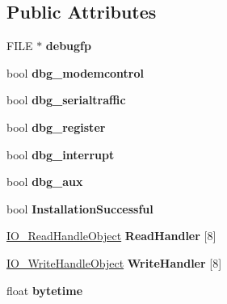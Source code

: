 \subsection*{Public Attributes}
\begin{DoxyCompactItemize}
\item 
\hypertarget{classCSerial_a67f37feb590d4f760e02194d97695ab1}{F\-I\-L\-E $\ast$ {\bfseries debugfp}}\label{classCSerial_a67f37feb590d4f760e02194d97695ab1}

\item 
\hypertarget{classCSerial_a3d950dbe5126390b733ce4a9480b2705}{bool {\bfseries dbg\-\_\-modemcontrol}}\label{classCSerial_a3d950dbe5126390b733ce4a9480b2705}

\item 
\hypertarget{classCSerial_af9e0c7fc953f326d6b9f03bb109fed68}{bool {\bfseries dbg\-\_\-serialtraffic}}\label{classCSerial_af9e0c7fc953f326d6b9f03bb109fed68}

\item 
\hypertarget{classCSerial_a84b4d02b7b4c5a55a7437fe23e5f5ca0}{bool {\bfseries dbg\-\_\-register}}\label{classCSerial_a84b4d02b7b4c5a55a7437fe23e5f5ca0}

\item 
\hypertarget{classCSerial_a81a9f2fd1073b8d3707d9eec242d7049}{bool {\bfseries dbg\-\_\-interrupt}}\label{classCSerial_a81a9f2fd1073b8d3707d9eec242d7049}

\item 
\hypertarget{classCSerial_a9e26d371839dcbcc62df76c4d0940327}{bool {\bfseries dbg\-\_\-aux}}\label{classCSerial_a9e26d371839dcbcc62df76c4d0940327}

\item 
\hypertarget{classCSerial_a997443b5fab411ef9300ff3414ea3049}{bool {\bfseries Installation\-Successful}}\label{classCSerial_a997443b5fab411ef9300ff3414ea3049}

\item 
\hypertarget{classCSerial_ae1a06ab3d086f8fc065817a43ab88b0f}{\hyperlink{classIO__ReadHandleObject}{I\-O\-\_\-\-Read\-Handle\-Object} {\bfseries Read\-Handler} \mbox{[}8\mbox{]}}\label{classCSerial_ae1a06ab3d086f8fc065817a43ab88b0f}

\item 
\hypertarget{classCSerial_a3b2f8bb32f40febb5052ad87d31e6f48}{\hyperlink{classIO__WriteHandleObject}{I\-O\-\_\-\-Write\-Handle\-Object} {\bfseries Write\-Handler} \mbox{[}8\mbox{]}}\label{classCSerial_a3b2f8bb32f40febb5052ad87d31e6f48}

\item 
\hypertarget{classCSerial_aa7cd20411697f85c5aeec90ae28677f9}{float {\bfseries bytetime}}\label{classCSerial_aa7cd20411697f85c5aeec90ae28677f9}


\end{DoxyCompactItemize}
